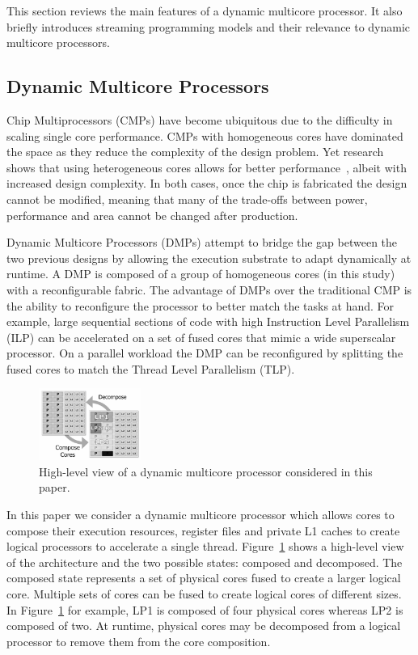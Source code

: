 This section reviews the main features of a dynamic multicore processor.
It also  briefly introduces streaming programming models and their relevance to dynamic multicore processors.

\subsection{Dynamic Multicore Processors}


Chip Multiprocessors (CMPs) have become ubiquitous due to the difficulty in scaling single core performance.
CMPs with homogeneous cores have dominated the space as they reduce the complexity of the design problem.
Yet research shows that using heterogeneous cores allows for better performance~\cite{suleman2009asymmetric}, albeit with increased design complexity. 
In both cases, once the chip is fabricated the design cannot be modified, meaning that many of the trade-offs between power, performance and area cannot be changed after production.

Dynamic Multicore Processors (DMPs) attempt to bridge the gap between the two previous designs by allowing the execution substrate to adapt dynamically at runtime.
A DMP is composed of a group of homogeneous cores (in this study) with a reconfigurable fabric.
The advantage of DMPs over the traditional CMP is the ability to reconfigure the processor to better match the tasks at hand.
For example, large sequential sections of code with high Instruction Level Parallelism (ILP) can be accelerated on a set of fused cores that mimic a wide superscalar processor.
On a parallel workload the DMP can be reconfigured by splitting the fused cores to match the Thread Level Parallelism (TLP).

\begin{figure}[t]
    \centering
    \includegraphics[width=0.3\textwidth]{streamit-paper/graphics/dmcgraph.pdf}
    \caption{High-level view of a dynamic multicore processor considered in this paper.}
    \label{fig:dynmulticore}
\end{figure}

In this paper we consider a dynamic multicore processor which allows cores to compose their execution resources, register files and private L1 caches to create logical processors to accelerate a single thread.
Figure~\ref{fig:dynmulticore} shows a high-level view of the architecture and the two possible states: composed and decomposed.
The composed state represents a set of physical cores fused to create a larger logical core.
Multiple sets of cores can be fused to create logical cores of different sizes.
In Figure~\ref{fig:dynmulticore} for example, LP1 is composed of four physical cores whereas LP2 is composed of two.
At runtime, physical cores may be decomposed from a logical processor to remove them from the core composition.

